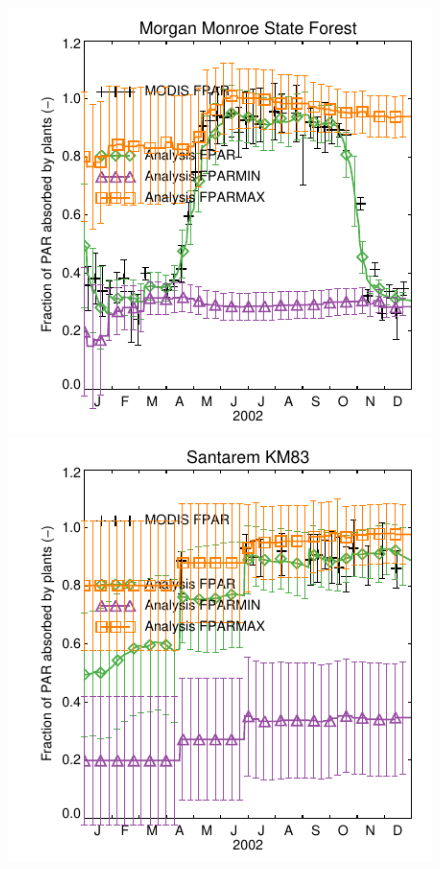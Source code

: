 \documentclass[a4paper,12pt]{article}
\begin{document}
\begin{figure}[hp]
\begin{center}
\includegraphics[scale=1.0]{Morgan_Monroe_State_Forest.dayplot.2002.FPAR.MODIS.pdf}
\includegraphics[scale=1.0]{Santarem_KM83.dayplot.2002.FPAR.MODIS.pdf}

\end{center}
\end{figure}
\end{document}
